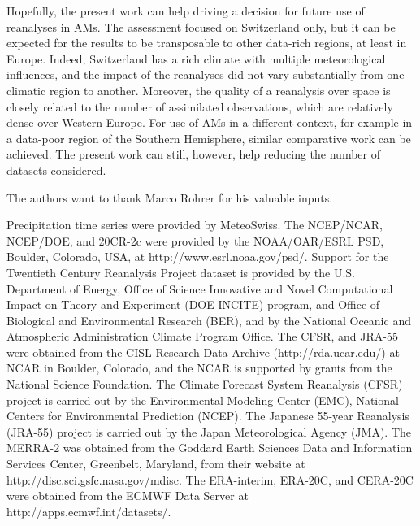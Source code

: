 \documentclass{ametsoc}
\begin{document}
Hopefully, the present work can help driving a decision for future use of reanalyses in AMs. The assessment focused on Switzerland only, but it can be expected for the results to be transposable to other data-rich regions, at least in Europe. Indeed, Switzerland has a rich climate with multiple meteorological influences, and the impact of the reanalyses did not vary substantially from one climatic region to another. Moreover, the quality of a reanalysis over space is closely related to the number of assimilated observations, which are relatively dense over Western Europe. For use of AMs in a different context, for example in a data-poor region of the Southern Hemisphere, similar comparative work can be achieved. The present work can still, however, help reducing the number of datasets considered.








%
\acknowledgments
The authors want to thank Marco Rohrer for his valuable inputs.

Precipitation time series were provided by MeteoSwiss. The NCEP/NCAR, NCEP/DOE, and 20CR-2c were provided by the NOAA/OAR/ESRL PSD, Boulder, Colorado, USA, at http://www.esrl.noaa.gov/psd/. Support for the Twentieth Century Reanalysis Project dataset is provided by the U.S. Department of Energy, Office of Science Innovative and Novel Computational Impact on Theory and Experiment (DOE INCITE) program, and Office of Biological and Environmental Research (BER), and by the National Oceanic and Atmospheric Administration Climate Program Office. The CFSR, and JRA-55 were obtained from the CISL Research Data Archive (http://rda.ucar.edu/) at NCAR in Boulder, Colorado, and the NCAR is supported by grants from the National Science Foundation. The Climate Forecast System Reanalysis (CFSR) project is carried out by the Environmental Modeling Center (EMC), National Centers for Environmental Prediction (NCEP). The Japanese 55-year Reanalysis (JRA-55) project is carried out by the Japan Meteorological Agency (JMA). The MERRA-2 was obtained from the Goddard Earth Sciences Data and Information Services Center, Greenbelt, Maryland, from their website at http://disc.sci.gsfc.nasa.gov/mdisc. The ERA-interim, ERA-20C, and CERA-20C were obtained from the ECMWF Data Server at http://apps.ecmwf.int/datasets/. 
\end{document}
